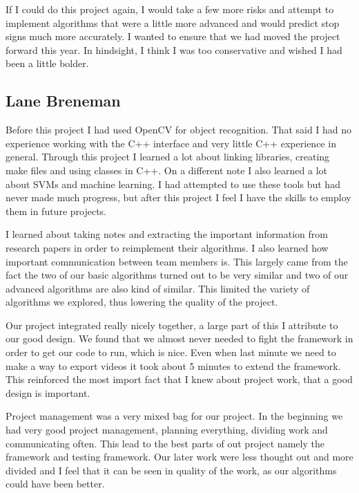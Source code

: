 \documentclass[letterpaper,10pt,titlepage]{article}
\begin{document}
If I could do this project again, I would take a few more risks and attempt to
implement algorithms that were a little more advanced and would predict stop 
signs much more accurately. I wanted to ensure that we had moved the project 
forward this year. In hindsight, I think I was too conservative and wished I 
had been a little bolder.

\subsection*{Lane Breneman}

Before this project I had used OpenCV for object recognition. That said I had
no experience working with the C++ interface and very little C++ experience in
general. Through this project I learned a lot about linking libraries, creating
make files and using classes in C++. On a different note I also learned a lot
about SVMs and machine learning. I had attempted to use these tools but had
never made much progress, but after this project I feel I have the skills to
employ them in future projects.

I learned about taking notes and extracting the important information from 
research papers in order to reimplement their algorithms. I also learned 
how important communication between team members is. This largely came from
the fact the two of our basic algorithms turned out to be very similar and 
two of our advanced algorithms are also kind of similar. This limited the
variety of algorithms we explored, thus lowering the quality of the project.

Our project integrated really nicely together, a large part of this I 
attribute to our good design. We found that we almost never needed to
fight the framework in order to get our code to run, which is nice. 
Even when last minute we need to make a way to export videos it took 
about 5 minutes to extend the framework. This reinforced the most 
import fact that I knew about project work, that a good design is 
important.

Project management was a very mixed bag for our project. In the 
beginning we had very good project management, planning everything,
dividing work and communicating often. This lead to the best parts
of out project namely the framework and testing framework. Our later work
were less thought out and more divided and I feel that it can be seen in
quality of the work, as our algorithms could have been better.
\end{document}
